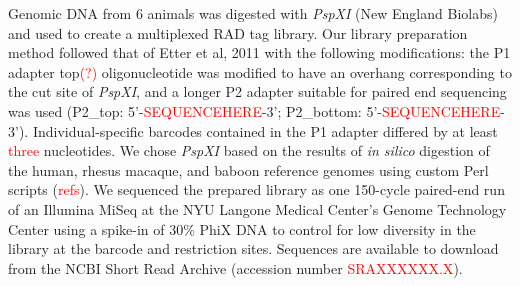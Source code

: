 \documentclass[12pt]{article}
\begin{document}
	Genomic DNA from 6 animals was digested with \emph{PspXI} (New England Biolabs) and used to create a multiplexed RAD tag library. Our library preparation method followed that of Etter et al, 2011 with the following modifications: the P1 adapter top\textcolor{red}{(?)} oligonucleotide was modified to have an overhang corresponding to the cut site of \emph{PspXI}, and a longer P2 adapter suitable for paired end sequencing was used (P2\_top: 5'-\textcolor{red}{SEQUENCEHERE}-3'; P2\_bottom: 5'-\textcolor{red}{SEQUENCEHERE}-3'). Individual-specific barcodes contained in the P1 adapter differed by at least \textcolor{red}{three} nucleotides. We chose \emph{PspXI} based on the results of \emph{in silico} digestion of the human, rhesus macaque, and baboon reference genomes using custom Perl scripts (\textcolor{red}{refs}). We sequenced the prepared library as one 150-cycle paired-end run of an Illumina MiSeq at the NYU Langone Medical Center's Genome Technology Center using a spike-in of 30\% PhiX DNA to control for low diversity in the library at the barcode and restriction sites. Sequences are available to download from the NCBI Short Read Archive (accession number \textcolor{red}{SRAXXXXXX.X}).
	
\end{document}
